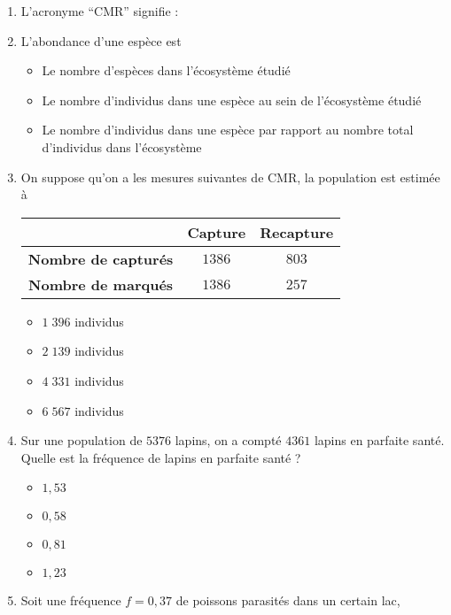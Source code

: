 \documentclass[11pt]{article}
\begin{document}
\begin{enumerate}
  \item L'acronyme ``CMR'' signifie :
  \item L'abondance d'une espèce est
    \begin{itemize}[label=$\Box$]
      \item Le nombre d'espèces dans l'écosystème étudié
      \item Le nombre d'individus dans une espèce au sein de l'écosystème étudié
      \item {\small Le nombre d'individus dans une espèce par rapport au nombre total
        d'individus dans l'écosystème}
    \end{itemize}
  \item On suppose qu'on a les mesures suivantes de CMR, la population est
    estimée à
\begin{center}
\begin{tabular}{ccc}
  \toprule
  & \textbf{Capture} & \textbf{Recapture} \\ \midrule
  \textbf{Nombre de capturés} & $1386$ & $803$ \\
  \textbf{Nombre de marqués} & $1386$ & $257$ \\ \bottomrule
 \end{tabular}
\end{center}
\begin{multicols}{2}
\begin{itemize}[label=$\Box$]
  \item $1\;396$ individus
  \item $2\;139$ individus
  \item $4\;331$ individus
  \item $6\;567$ individus
\end{itemize}
\end{multicols}
\item Sur une population de $5376$ lapins, on a compté $4361$ lapins en parfaite
  santé. Quelle est la fréquence de lapins en parfaite santé ?
  \begin{multicols}{4}
  \begin{itemize}[label=$\Box$]
    \item $1,53$
    \item $0,58$
    \item $0,81$
    \item $1,23$
  \end{itemize}
  \end{multicols}
\item Soit une fréquence $f=0,37$ de poissons parasités dans un certain lac,

\end{enumerate}
\end{document}
